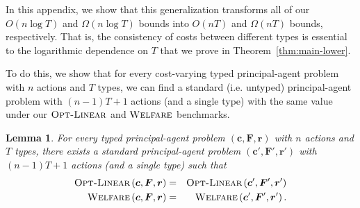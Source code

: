 \documentclass{article}
\newtheorem{lemma}[theorem]{Lemma}
\newcommand{\costvector}{\bm{c}}
\newcommand{\ForecastTensor}{\bm{F}}
\newcommand{\rewardvector}{\bm{r}}
\newcommand{\PrincipalAgentProblem}{\left(\costvector, \ForecastTensor, \rewardvector\right)}
\newcommand{\PrincipalAgentProblemPrime}{\left(\costvector', \ForecastTensor', \rewardvector'\right)}
\newcommand{\OWelfare}{\textsc{Welfare}}
\newcommand{\OLinear}{\textsc{Opt-Linear}}
\begin{document}
In this appendix, we show that this generalization transforms all of our $O(n \log T)$ and $\Omega(n \log T)$ bounds into $O(nT)$ and $\Omega(nT)$ bounds, respectively. That is, the consistency of costs between different types is essential to the logarithmic dependence on $T$ that we prove in Theorem~\ref{thm:main-lower}.

To do this, we show that for every cost-varying typed principal-agent problem with $n$ actions and $T$ types, we can find a standard (i.e. untyped) principal-agent problem with $(n-1)T+1$ actions (and a single type) with the same value under our $\OLinear$ and $\OWelfare$ benchmarks. 

\begin{lemma}\label{lem:diff_costs_upper}
For every typed principal-agent problem $\PrincipalAgentProblem$ with $n$ actions and $T$ types, there exists a standard principal-agent problem $\PrincipalAgentProblemPrime$ with $(n-1)T+1$ actions (and a single type) such that
\begin{eqnarray*}
\OLinear \PrincipalAgentProblem &=& \OLinear \PrincipalAgentProblemPrime\\
\OWelfare \PrincipalAgentProblem &=& \OWelfare \PrincipalAgentProblemPrime.
\end{eqnarray*}
\end{lemma}
\end{document}
